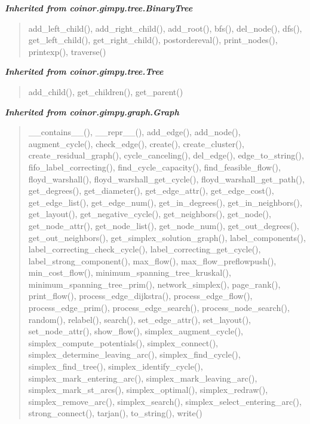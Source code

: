 \large{\textbf{\textit{Inherited from coinor.gimpy.tree.BinaryTree}}}

\begin{quote}
add\_left\_child(), add\_right\_child(), add\_root(), bfs(), del\_node(), dfs(), get\_left\_child(), get\_right\_child(), postordereval(), print\_nodes(), printexp(), traverse()
\end{quote}

\large{\textbf{\textit{Inherited from coinor.gimpy.tree.Tree}}}

\begin{quote}
add\_child(), get\_children(), get\_parent()
\end{quote}

\large{\textbf{\textit{Inherited from coinor.gimpy.graph.Graph}}}

\begin{quote}
\_\_contains\_\_(), \_\_repr\_\_(), add\_edge(), add\_node(), augment\_cycle(), check\_edge(), create(), create\_cluster(), create\_residual\_graph(), cycle\_canceling(), del\_edge(), edge\_to\_string(), fifo\_label\_correcting(), find\_cycle\_capacity(), find\_feasible\_flow(), floyd\_warshall(), floyd\_warshall\_get\_cycle(), floyd\_warshall\_get\_path(), get\_degrees(), get\_diameter(), get\_edge\_attr(), get\_edge\_cost(), get\_edge\_list(), get\_edge\_num(), get\_in\_degrees(), get\_in\_neighbors(), get\_layout(), get\_negative\_cycle(), get\_neighbors(), get\_node(), get\_node\_attr(), get\_node\_list(), get\_node\_num(), get\_out\_degrees(), get\_out\_neighbors(), get\_simplex\_solution\_graph(), label\_components(), label\_correcting\_check\_cycle(), label\_correcting\_get\_cycle(), label\_strong\_component(), max\_flow(), max\_flow\_preflowpush(), min\_cost\_flow(), minimum\_spanning\_tree\_kruskal(), minimum\_spanning\_tree\_prim(), network\_simplex(), page\_rank(), print\_flow(), process\_edge\_dijkstra(), process\_edge\_flow(), process\_edge\_prim(), process\_edge\_search(), process\_node\_search(), random(), relabel(), search(), set\_edge\_attr(), set\_layout(), set\_node\_attr(), show\_flow(), simplex\_augment\_cycle(), simplex\_compute\_potentials(), simplex\_connect(), simplex\_determine\_leaving\_arc(), simplex\_find\_cycle(), simplex\_find\_tree(), simplex\_identify\_cycle(), simplex\_mark\_entering\_arc(), simplex\_mark\_leaving\_arc(), simplex\_mark\_st\_arcs(), simplex\_optimal(), simplex\_redraw(), simplex\_remove\_arc(), simplex\_search(), simplex\_select\_entering\_arc(), strong\_connect(), tarjan(), to\_string(), write()
\end{quote}

